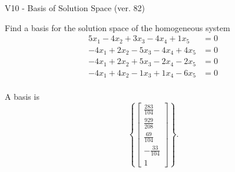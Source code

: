 \begin{exercise}
  \begin{exerciseTitle}V10 - Basis of Solution Space (ver. 82)\end{exerciseTitle}
  \begin{exerciseStatement}
    Find a basis for the solution space of the homogeneous system 
\begin{align*}
 5 x_ 1 -4 x_ 2 + 3 x_ 3 -4 x_ 4 + 1 x_ 5 &= 0  \\ 
  -4 x_ 1 + 2 x_ 2 -5 x_ 3 -4 x_ 4 + 4 x_ 5 &= 0  \\ 
  -4 x_ 1 + 2 x_ 2 + 5 x_ 3 -2 x_ 4 -2 x_ 5 &= 0  \\ 
  -4 x_ 1 + 4 x_ 2 -1 x_ 3 + 1 x_ 4 -6 x_ 5 &= 0  \\ 
 \end{align*}


 
  \end{exerciseStatement}

  \begin{exerciseAnswer}
   A basis is   
\[\left\{\left[\begin{array}{c}
\frac{283}{104} \\
\frac{929}{208} \\
\frac{69}{104} \\
-\frac{33}{104} \\
1
\end{array}\right]\right\}.\]

  


  \end{exerciseAnswer}
\end{exercise}